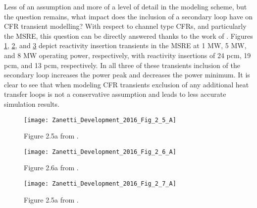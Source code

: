 \documentclass[review]{elsarticle}
\begin{document}
\par Less of an assumption and more of a level of detail in the modeling scheme,
but the question remains, what impact does the inclusion of a secondary loop
have on CFR transient modelling? With respect to channel type CFRs, and
particularly the MSRE, this question can be directly answered thanks to the work
of \cite{zanetti_development_2016}. Figures \ref{fig:zanetti_sec_1mw},
\ref{fig:zanetti_sec_5mw}, and \ref{fig:zanetti_sec_8mw} 
depict reactivity insertion
transients in the MSRE at 1 MW, 5 MW, and 8 MW operating power, respectively,
with reactivity insertions of 24 pcm, 19 pcm, and 13 pcm,
respectively. In all three of these transients inclusion of the secondary loop
increases the power peak and decreases the power minimum. It is clear to see
that when modeling CFR transients exclusion of any additional heat transfer
loops is not a conservative assumption and leads to less accurate simulation
results.

\begin{figure}[h]
   \centering
   \texttt{[image: Zanetti\_Development\_2016\_Fig\_2\_5\_A]}
   \caption{Figure 2.5a from \cite{zanetti_development_2016}.} 
   \label{fig:zanetti_sec_1mw}
\end{figure}

\begin{figure}[h]
   \centering
   \texttt{[image: Zanetti\_Development\_2016\_Fig\_2\_6\_A]}
   \caption{Figure 2.6a from \cite{zanetti_development_2016}.} 
   \label{fig:zanetti_sec_5mw}
\end{figure}

\begin{figure}[h]
   \centering
   \texttt{[image: Zanetti\_Development\_2016\_Fig\_2\_7\_A]}
   \caption{Figure 2.5a from \cite{zanetti_development_2016}.} 
   \label{fig:zanetti_sec_8mw}
\end{figure}
\end{document}
